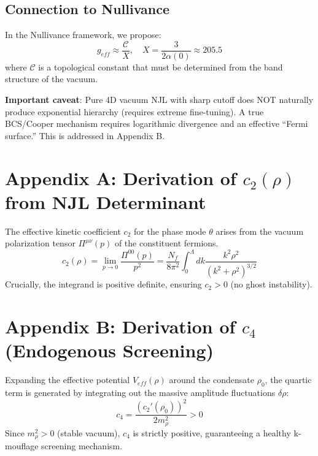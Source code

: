 \documentclass[a4paper,12pt]{article}
\begin{document}
\subsection{Connection to Nullivance}
In the Nullivance framework, we propose:
\begin{equation}
 g_{eff} \approx \frac{\mathcal{C}}{X}, \quad X = \frac{3}{2\alpha(0)} \approx 205.5
\end{equation}
where $\mathcal{C}$ is a topological constant that must be determined from the band structure of the vacuum.

\textbf{Important caveat}: Pure 4D vacuum NJL with sharp cutoff does NOT naturally produce exponential hierarchy (requires extreme fine-tuning). A true BCS/Cooper mechanism requires logarithmic divergence and an effective ``Fermi surface.'' This is addressed in Appendix B.

\newpage
\appendix
\section{Appendix A: Derivation of $c_2(\rho)$ from NJL Determinant}
The effective kinetic coefficient $c_2$ for the phase mode $\theta$ arises from the vacuum polarization tensor $\Pi^{\mu\nu}(p)$ of the constituent fermions.
\begin{equation}
    c_2(\rho) = \lim_{p\to 0} \frac{\Pi^{00}(p)}{p^2} = \frac{N_f}{8\pi^2} \int_0^\Lambda dk \frac{k^2 \rho^2}{(k^2 + \rho^2)^{3/2}}
\end{equation}
Crucially, the integrand is positive definite, ensuring $c_2 > 0$ (no ghost instability).

\section{Appendix B: Derivation of $c_4$ (Endogenous Screening)}
Expanding the effective potential $V_{eff}(\rho)$ around the condensate $\rho_0$, the quartic term is generated by integrating out the massive amplitude fluctuations $\delta \rho$:
\begin{equation}
    c_4 = \frac{(c_2'(\rho_0))^2}{2 m_\rho^2} > 0
\end{equation}
Since $m_\rho^2 > 0$ (stable vacuum), $c_4$ is strictly positive, guaranteeing a healthy k-mouflage screening mechanism.
\end{document}
